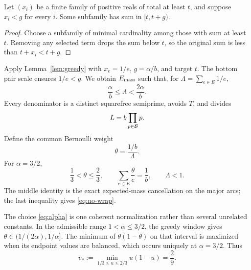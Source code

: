 \begin{lemma}\label{lem:greedy}
Let $(x_i)$ be a finite family of positive reals of total at least $t$, and
suppose $x_i<g$ for every $i$.  Some subfamily has sum in $[t,t+g)$.
\end{lemma}
\begin{proof}
Choose a subfamily of minimal cardinality among those with sum at least $t$.
Removing any selected term drops the sum below $t$, so the original sum is less
than $t+x_i<t+g$.
\end{proof}

Apply Lemma~\ref{lem:greedy} with $x_e=1/e$, $g=\alpha/b$, and target $t$.
The bottom pair scale ensures $1/e<g$.  We obtain $E_{\mathrm{mass}}$ such that, for
$\Lambda=\sum_{e\in E}1/e$,
\begin{equation}\label{eq:load-window}
 \frac\alpha b\le\Lambda<\frac{2\alpha}{b}.
\end{equation}
Every denominator is a distinct squarefree semiprime, avoids $T$, and divides
\begin{equation}\label{eq:period}
 L=b\prod_{p\in\mathcal B}p.
\end{equation}
Define the common Bernoulli weight
\begin{equation}\label{eq:theta}
 \theta=\frac{1/b}{\Lambda}.
\end{equation}
For $\alpha=3/2$,
\begin{equation}\label{eq:theta-window}
 \frac13<\theta\le\frac23,
 \qquad
 \sum_{e\in E}\frac\theta e=\frac1b,
 \qquad
 \Lambda<1.
\end{equation}
The middle identity is the exact expected-mass cancellation on the major arcs;
the last inequality gives \eqref{eq:no-wrap}.

The choice \eqref{eq:alpha} is one coherent normalization rather than several
unrelated constants.  In the admissible range $1<\alpha\le3/2$, the greedy
window gives $\theta\in(1/(2\alpha),1/\alpha]$.  The minimum of
$\theta(1-\theta)$ on that interval is maximized when its endpoint values are
balanced, which occurs uniquely at $\alpha=3/2$.  Thus
\begin{equation}\label{eq:vstar}
 v_*:=\min_{1/3\le u\le2/3}u(1-u)=\frac29.
\end{equation}

